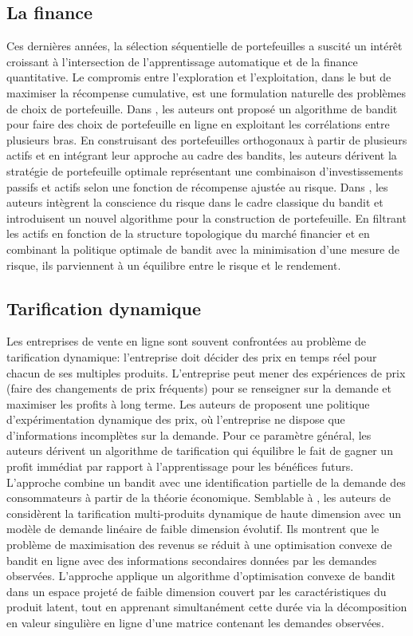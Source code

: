 \documentclass[conference]{IEEEtran}
\newcommand{\1}[1]{\mathbbm{1}_{\left\{#1\right\}}}
\begin{document}
\subsection{La finance}
Ces dernières années, la sélection séquentielle de portefeuilles a suscité un intérêt croissant à l'intersection de l'apprentissage automatique et de la finance quantitative. Le compromis entre l'exploration et l'exploitation, dans le but de maximiser la récompense cumulative, est une formulation naturelle des problèmes de choix de portefeuille. Dans \cite{shen2015portfolio}, les auteurs ont proposé un algorithme de bandit pour faire des choix de portefeuille en ligne en exploitant les corrélations entre plusieurs bras. En construisant des portefeuilles orthogonaux à partir de plusieurs actifs et en intégrant leur approche au cadre des bandits, les auteurs dérivent la stratégie de portefeuille optimale représentant une combinaison d'investissements passifs et actifs selon une fonction de récompense ajustée au risque. 
Dans \cite{huo2017risk}, les auteurs intègrent la conscience du risque dans le cadre classique du bandit et introduisent un nouvel algorithme pour la construction de portefeuille. En filtrant les actifs en fonction de la structure topologique du marché financier et en combinant la politique optimale de bandit avec la minimisation d'une mesure de risque, ils parviennent à un équilibre entre le risque et le rendement.

\subsection{Tarification dynamique}
Les entreprises de vente en ligne sont souvent confrontées au problème de tarification dynamique: l'entreprise doit décider des prix en temps réel pour chacun de ses multiples produits. L'entreprise peut mener des expériences de prix (faire des changements de prix fréquents) pour se renseigner sur la demande et maximiser les profits à long terme. Les auteurs de \cite{misra2018dynamic} proposent une politique d'expérimentation dynamique des prix, où l'entreprise ne dispose que d'informations incomplètes sur la demande. Pour ce paramètre général, les auteurs dérivent un algorithme de tarification qui équilibre le fait de gagner un profit immédiat par rapport à l'apprentissage pour les bénéfices futurs. L'approche combine un bandit avec une identification partielle de la demande des consommateurs à partir de la théorie économique. Semblable à \cite{misra2018dynamic}, les auteurs de \cite{mueller2018low} considèrent la tarification multi-produits dynamique de haute dimension avec un modèle de demande linéaire de faible dimension évolutif. Ils montrent que le problème de maximisation des revenus se réduit à une optimisation convexe de bandit en ligne avec des informations secondaires données par les demandes observées. L'approche applique un algorithme d'optimisation convexe de bandit dans un espace projeté de faible dimension couvert par les caractéristiques du produit latent, tout en apprenant simultanément cette durée via la décomposition en valeur singulière en ligne d'une matrice contenant les demandes observées.
 
\end{document}

